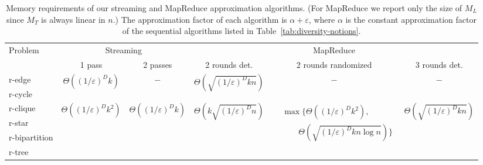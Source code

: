 \documentclass{article}
\renewcommand{\epsilon}{\varepsilon}
\newcommand{\BT}[1]{\Theta\left( #1 \right)}
\begin{document}
\begin{table}
  \small
  \centering
  \begin{tabular}{l@{\hskip 2pt} | c@{\hskip 1pt} c@{\hskip 1pt} | c@{\hskip -1pt} c@{\hskip 0pt} c}
    \toprule
    Problem
     & \multicolumn{2}{c|}{Streaming}
     & \multicolumn{3}{c}{MapReduce}
    \\
& 1 pass
     & 2 passes
     & 2 rounds det.
     & 2 rounds randomized
     & 3 rounds det.
    \\
    \midrule
    r-edge 
     & \multirow{2}{*}{$\BT{(1/\epsilon)^D k}$}
     & \multirow{2}{*}{$-$}
     & \multirow{2}{*}{$\BT{\sqrt{(1/\epsilon)^D kn}}$}
     & \multirow{2}{*}{$-$}
     & \multirow{2}{*}{$-$}
    \\
    r-cycle & & & & & \\
    \midrule
    r-clique 
     & \multirow{4}{*}{
       $\BT{(1/\epsilon)^D k^2}$
       }
     & \multirow{4}{*}{
       $\BT{(1/\epsilon)^D k}$
       }
     & \multirow{4}{*}{
       $\BT{k\sqrt{(1/\epsilon)^Dn}}$
       }
     & \multirow{4}{*}{
       $\begin{aligned}&\max\Big\{\BT{({1/\epsilon})^Dk^2},\\ &\qquad\BT{\sqrt{(1/\epsilon)^Dkn\log n}}\Big\}\end{aligned}$
       }
     & \multirow{4}{*}{
       $\BT{\sqrt{(1/\epsilon)^D kn}}$
       }
    \\
    r-star & & & & & \\
    r-bipartition & & & & & \\
    r-tree & & & & & \\
    \bottomrule
  \end{tabular}
  \caption{Memory requirements of our streaming and MapReduce approximation
    algorithms. (For MapReduce we report only the size of $M_L$ since
    $M_T$ is always linear in $n$.)  The approximation factor of each algorithm is $\alpha+\epsilon$,
    where $\alpha$ is the constant approximation factor of the
    sequential algorithms listed in Table~\ref{tab:diversity-notions}.
    }\label{tab:mapreduce-streaming}
\end{table}
\end{document}
